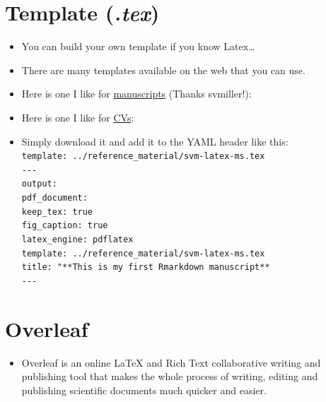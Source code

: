 \documentclass[]{article}
\providecommand{\tightlist}{%
  \setlength{\itemsep}{0pt}\setlength{\parskip}{0pt}}
\begin{document}
\section{\texorpdfstring{Template
(\emph{.tex})}{Template (.tex)}}\label{template-.tex}

\begin{itemize}
\item
  You can build your own template if you know Latex\ldots{}
\item
  There are many templates available on the web that you can use.
\item
  Here is one I like for
  \href{https://github.com/svmiller/svm-r-markdown-templates/blob/master/svm-latex-ms.tex}{manuscripts}
  (Thanks svmiller!):
\item
  Here is one I like for
  \href{https://github.com/svmiller/svm-r-markdown-templates/blob/master/svm-latex-cv.tex}{CVs}:
\item
  Simply download it and add it to the YAML header like this:
  \texttt{template:\ ../reference\_material/svm-latex-ms.tex}\\
  \texttt{-\/-\/-}\\
  \texttt{output:}\\
  \texttt{pdf\_document:}\\
  \texttt{keep\_tex:\ true}\\
  \texttt{fig\_caption:\ true}\\
  \texttt{latex\_engine:\ pdflatex}\\
  \texttt{template:\ ../reference\_material/svm-latex-ms.tex}\\
  \texttt{title:\ "**This\ is\ my\ first\ Rmarkdown\ manuscript**}\\
  \texttt{-\/-\/-}
\end{itemize}

\section{Overleaf}\label{overleaf}

\begin{itemize}
\tightlist
\item
  Overleaf is an online LaTeX and Rich Text collaborative writing and
  publishing tool that makes the whole process of writing, editing and
  publishing scientific documents much quicker and easier.
\end{itemize}
\end{document}
